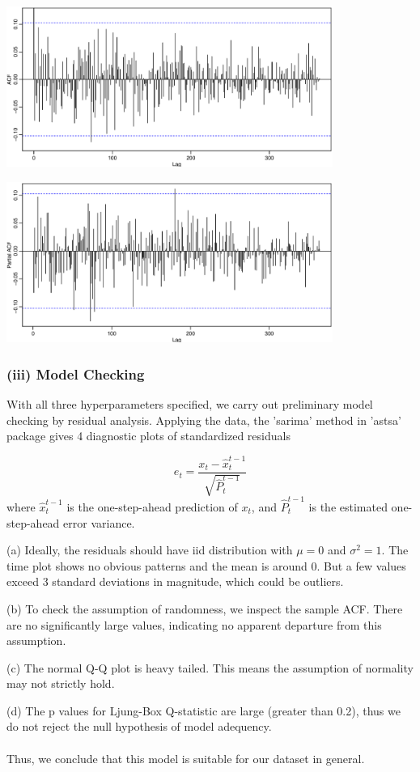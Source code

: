 \documentclass[11pt,a4paper]{article}
\begin{document}
\begin{center}
   \includegraphics[width=0.8\textwidth]{acf2.eps}
\end{center}
\graphicspath{{./Figures/}}

\begin{center}
   \includegraphics[width=0.8\textwidth]{pacf2.eps}
\end{center}
\graphicspath{{./Figures/}}

\subsubsection*{(iii) Model Checking}
With all three hyperparameters specified, we carry out preliminary model checking by residual analysis. Applying the data, the 'sarima' method in 'astsa' package gives 4 diagnostic plots of standardized residuals

$$ e_t = \frac{x_t - \hat{x}_{t}^{t-1}} {\sqrt{\hat{P}_{t}^{t-1}}} $$
where $\hat{x}_{t}^{t-1}$ is the one-step-ahead prediction of $x_t$,
and $\hat{P}_{t}^{t-1}$ is the estimated one-step-ahead error variance. \\

\par
(a) Ideally, the residuals should have iid distribution with $\mu=0$ and $\sigma^2=1$. The time plot shows no obvious patterns and the mean is around 0. But a few values exceed 3 standard deviations in magnitude, which could be outliers.
\par
(b) To check the assumption of randomness, we inspect the sample ACF. There are no significantly large values, indicating no apparent departure from this assumption.
\par
(c) The normal Q-Q plot is heavy tailed. This means the assumption of normality may not strictly hold.
\par
(d) The p values for Ljung-Box Q-statistic are large (greater than 0.2), thus we do not reject the null hypothesis of model adequency.
\\ \\ Thus, we conclude that this model is suitable for our dataset in general.
\end{document}
